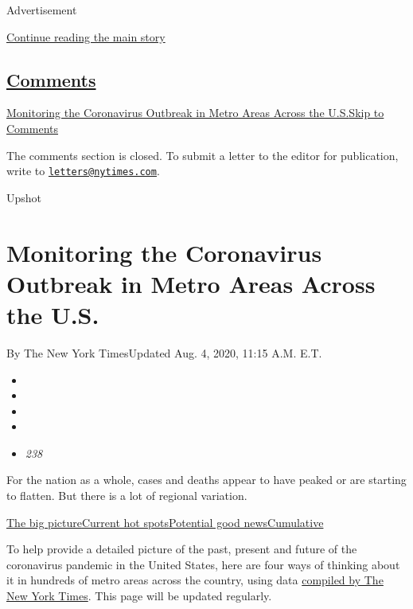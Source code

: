 Advertisement

\protect\hyperlink{after-top}{Continue reading the main story}

\hypertarget{comments}{%
\subsection{\texorpdfstring{\protect\hyperlink{commentsContainer}{Comments}}{Comments}}\label{comments}}

\href{}{Monitoring the Coronavirus Outbreak in Metro Areas Across the
U.S.}\href{}{Skip to Comments}

The comments section is closed. To submit a letter to the editor for
publication, write to
\href{mailto:letters@nytimes.com}{\nolinkurl{letters@nytimes.com}}.

Upshot

\hypertarget{monitoring-the-coronavirus-outbreak-in-metro-areas-across-the-us}{%
\section{Monitoring the Coronavirus Outbreak in Metro Areas Across the
U.S.}\label{monitoring-the-coronavirus-outbreak-in-metro-areas-across-the-us}}

By The New York TimesUpdated Aug. 4, 2020, 11:15 A.M. E.T.

\begin{itemize}
\item
\item
\item
\item
\item
  \emph{238}
\end{itemize}

For the nation as a whole, cases and deaths appear to have peaked or are
starting to flatten. But there is a lot of regional variation.

\protect\hyperlink{big-picture}{The big
picture}\protect\hyperlink{hotspots}{Current hot
spots}\protect\hyperlink{good-news}{Potential good
news}\protect\hyperlink{cumulative}{Cumulative}

To help provide a detailed picture of the past, present and future of
the coronavirus pandemic in the United States, here are four ways of
thinking about it in hundreds of metro areas across the country, using
data
\href{https://www.nytimes.com/article/coronavirus-county-data-us.html}{compiled
by The New York Times}. This page will be updated regularly.

